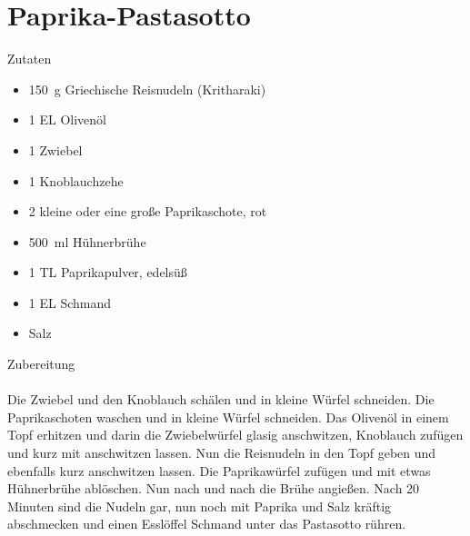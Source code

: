 \section*{Paprika-Pastasotto}
\ihead{}\ohead{}
\cfoot{}
{\Large Zutaten}
\begin{multicols}{2}
\begin{itemize}
    \item \SI{150}{g} Griechische Reisnudeln (Kritharaki)
    \item \num{1} EL Olivenöl
    \item \num{1} Zwiebel
    \item \num{1} Knoblauchzehe
     \item \num{2} kleine oder eine große Paprikaschote, rot
    \item \SI{500}{ml} Hühnerbrühe
    \item \num{1} TL Paprikapulver, edelsüß
    \item \num{1} EL Schmand
    \item Salz
\end{itemize}
\end{multicols}
\noindent
{\Large Zubereitung}\\
\\
Die Zwiebel und den Knoblauch schälen und in kleine Würfel schneiden.
Die Paprikaschoten waschen und in kleine Würfel schneiden.
Das Olivenöl in einem Topf erhitzen und darin die Zwiebelwürfel glasig anschwitzen, Knoblauch zufügen und kurz mit anschwitzen lassen.
Nun die Reisnudeln in den Topf geben und ebenfalls kurz anschwitzen lassen.
Die Paprikawürfel zufügen und mit etwas Hühnerbrühe ablöschen.
Nun nach und nach die Brühe angießen.
Nach 20 Minuten sind die Nudeln gar, nun noch mit Paprika und Salz kräftig abschmecken und einen Esslöffel Schmand unter das Pastasotto rühren.
